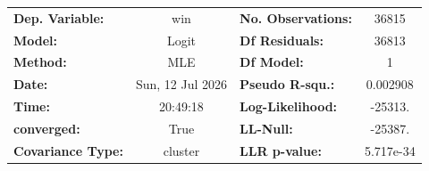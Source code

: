 \begin{tabular}{lclc}
\toprule
\textbf{Dep. Variable:}   &       win        & \textbf{  No. Observations:  } &    36815    \\
\textbf{Model:}           &      Logit       & \textbf{  Df Residuals:      } &    36813    \\
\textbf{Method:}          &       MLE        & \textbf{  Df Model:          } &        1    \\
\textbf{Date:}            & Sun, 12 Jul 2026 & \textbf{  Pseudo R-squ.:     } &  0.002908   \\
\textbf{Time:}            &     20:49:18     & \textbf{  Log-Likelihood:    } &   -25313.   \\
\textbf{converged:}       &       True       & \textbf{  LL-Null:           } &   -25387.   \\
\textbf{Covariance Type:} &     cluster      & \textbf{  LLR p-value:       } & 5.717e-34   \\
\bottomrule
\end{tabular}

